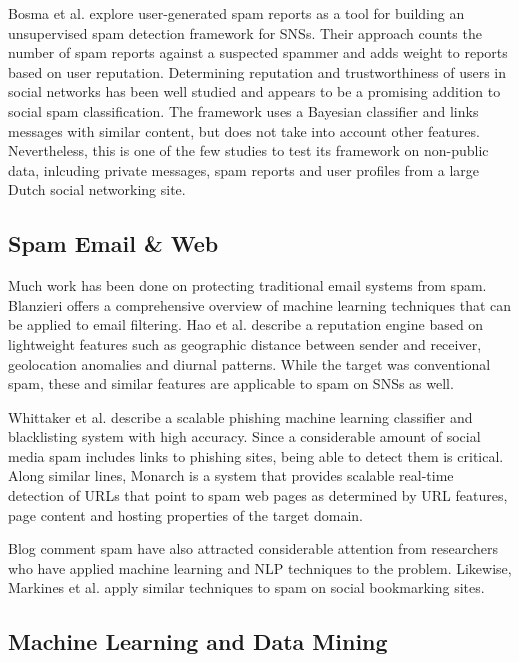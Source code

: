\documentclass[preprint]{acm_proc_article-sp}
\begin{document}
Bosma et al. \cite{bosma} explore user-generated spam reports as a tool for building an unsupervised spam detection framework for SNSs. Their approach counts the number of spam reports against a suspected spammer and adds weight to reports based on user reputation. Determining reputation and trustworthiness of users in social networks has been well studied \cite{bian, guha, zhang} and appears to be a promising addition to social spam classification. The framework uses a Bayesian classifier and links messages with similar content, but does not take into account other features. Nevertheless, this is one of the few studies to test its framework on non-public data, inlcuding private messages, spam reports and user profiles from a large Dutch social networking site.

\subsection{Spam Email \& Web}

Much work has been done on protecting traditional email systems from spam. Blanzieri \cite{blanzieri} offers a comprehensive overview of machine learning techniques that can be applied to email filtering. Hao et al. \cite{hao} describe a reputation engine based on lightweight features such as geographic distance between sender and receiver, geolocation anomalies and diurnal patterns. While the target was conventional spam, these and similar features are applicable to spam on SNSs as well.

Whittaker et al. \cite{whittaker} describe a scalable phishing machine learning classifier and blacklisting system with high accuracy. Since a considerable amount of social media spam includes links to phishing sites, being able to detect them is critical. Along similar lines, Monarch \cite{thomas} is a system that provides scalable real-time detection of URLs that point to spam web pages as determined by URL features, page content and hosting properties of the target domain.

Blog comment spam have also attracted considerable attention from researchers who have applied machine learning \cite{kolari, nag} and NLP \cite{mishne} techniques to the problem. Likewise, Markines et al. \cite{markines} apply similar techniques to spam on social bookmarking sites.

\subsection{Machine Learning and Data Mining}
\end{document}
